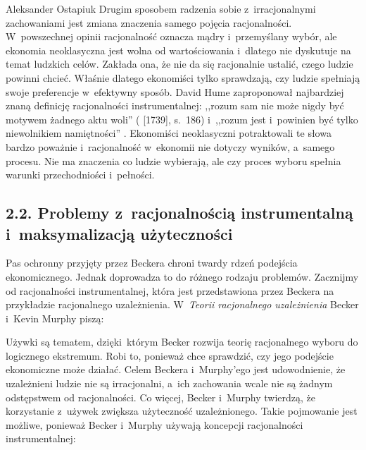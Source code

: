 \begin{artplenv}{Aleksander Ostapiuk}
Drugim sposobem radzenia sobie z~irracjonalnymi zachowaniami jest zmiana znaczenia samego pojęcia racjonalności.
W~powszechnej opinii racjonalność oznacza mądry i~przemyślany wybór, ale ekonomia neoklasyczna jest wolna od
wartościowania i~dlatego nie dyskutuje na temat ludzkich celów. Zakłada ona, że nie da się racjonalnie ustalić, czego
ludzie powinni chcieć. Właśnie dlatego ekonomiści tylko sprawdzają, czy ludzie spełniają swoje preferencje w~efektywny
sposób. David Hume zaproponował najbardziej znaną definicję racjonalności instrumentalnej: ,,rozum sam nie może nigdy być
motywem żadnego aktu woli''
(\cite{hume_traktat_1963} [1739], s.~186)
i~,,rozum
jest i~powinien być tylko niewolnikiem namiętności''
\parencite[s.~188]{hume_traktat_1963}.
Ekonomiści neoklasyczni
potraktowali te słowa bardzo poważnie i~racjonalność w~ekonomii nie dotyczy wyników, a~samego procesu. Nie ma znaczenia
co ludzie wybierają, ale czy proces wyboru spełnia warunki przechodniości i~pełności.

\subsection{2.2. Problemy z~racjonalnością instrumentalną i~maksymalizacją użyteczności}
Pas ochronny przyjęty przez Beckera chroni twardy rdzeń podejścia ekonomicznego. Jednak doprowadza to do różnego rodzaju
problemów. Zacznijmy od racjonalności instrumentalnej, która jest przedstawiona przez Beckera na przykładzie
racjonalnego uzależnienia. W~\textit{Teorii racjonalnego uzależnienia} Becker i~Kevin Murphy piszą: 


Używki są tematem, dzięki~którym Becker rozwija teorię racjonalnego wyboru do logicznego ekstremum. Robi to, ponieważ chce
sprawdzić, czy jego podejście ekonomiczne może działać. Celem Beckera i~Murphy'ego jest udowodnienie, że uzależnieni ludzie nie
są irracjonalni, a~ich zachowania wcale nie są żadnym odstępstwem od racjonalności. Co więcej, Becker i~Murphy
twierdzą, że korzystanie z~używek zwiększa użyteczność uzależnionego. Takie pojmowanie jest możliwe, ponieważ
Becker i~Murphy używają koncepcji racjonalności instrumentalnej: 


\end{artplenv}
